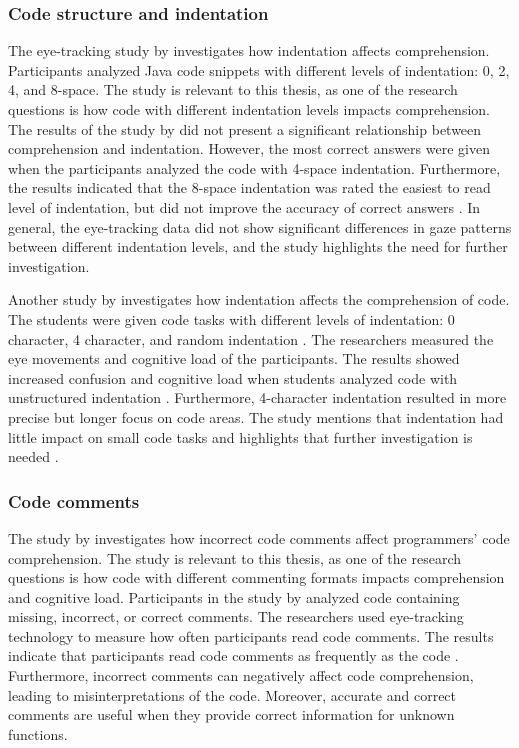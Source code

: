 \subsubsection{Code structure and indentation} 


The eye-tracking study by \citet{bauer2017indentations} investigates how indentation affects comprehension. Participants analyzed Java code snippets with different levels of indentation: 0, 2, 4, and 8-space. The study is relevant to this thesis, as one of the research questions is how code with different  indentation levels impacts comprehension. The results of the study by \citet{bauer2017indentations} did not present a significant relationship between comprehension and indentation. However, the most correct answers were given when the participants analyzed the code with 4-space indentation. Furthermore, the results indicated that the 8-space indentation was rated the easiest to read level of indentation, but did not improve the accuracy of correct answers \cite{bauer2017indentations}. In general, the eye-tracking data did not show significant differences in gaze patterns between different indentation levels, and the study highlights the need for further investigation. 


Another study by \citet{yorimoto2024quantitative} investigates how indentation affects the comprehension of code. The students were given code tasks with different levels of indentation: 0 character, 4 character, and random indentation \cite{yorimoto2024quantitative}. The researchers measured the eye movements and cognitive load of the participants. The results showed increased confusion and cognitive load when students analyzed code with unstructured indentation \cite{yorimoto2024quantitative}. Furthermore, 4-character indentation resulted in more precise but longer focus on code areas. The study mentions that indentation had little impact on small code tasks and highlights that further investigation is needed \cite{yorimoto2024quantitative}.  

\subsubsection{Code comments} 

The study by  \citet{bakhuizen2019comments} investigates how incorrect code comments affect programmers' code comprehension. The study is relevant to this thesis, as one of the research questions is how code with different  commenting formats impacts comprehension and cognitive load.  Participants in the study by  \citet{bakhuizen2019comments} analyzed code containing missing, incorrect, or correct comments.
The researchers used eye-tracking technology to measure how often participants read code comments. The results indicate that participants read code comments as frequently as the code \cite{bakhuizen2019comments}. Furthermore, incorrect comments can negatively affect code comprehension, leading to misinterpretations of the code. Moreover, accurate and correct comments are useful when they provide correct information for unknown functions. 

